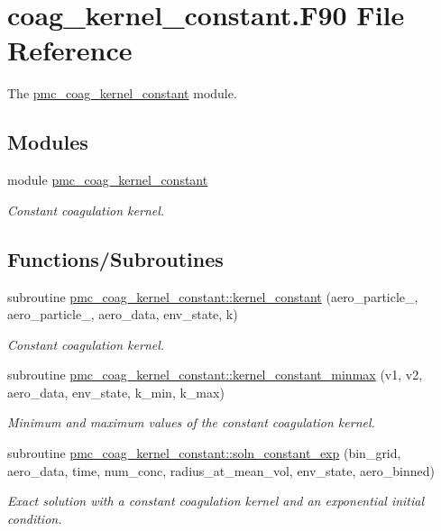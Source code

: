 \hypertarget{coag__kernel__constant_8_f90}{}\section{coag\+\_\+kernel\+\_\+constant.\+F90 File Reference}
\label{coag__kernel__constant_8_f90}


The \mbox{\hyperlink{namespacepmc__coag__kernel__constant}{pmc\+\_\+coag\+\_\+kernel\+\_\+constant}} module.  


\subsection*{Modules}
\begin{DoxyCompactItemize}
\item 
module \mbox{\hyperlink{namespacepmc__coag__kernel__constant}{pmc\+\_\+coag\+\_\+kernel\+\_\+constant}}
\begin{DoxyCompactList}\small\item\em Constant coagulation kernel. \end{DoxyCompactList}\end{DoxyCompactItemize}
\subsection*{Functions/\+Subroutines}
\begin{DoxyCompactItemize}
\item 
subroutine \mbox{\hyperlink{namespacepmc__coag__kernel__constant_ab7d28977bf4b5b1a3a7bdd716c496679}{pmc\+\_\+coag\+\_\+kernel\+\_\+constant\+::kernel\+\_\+constant}} (aero\+\_\+particle\+\_, aero\+\_\+particle\+\_, aero\+\_\+data, env\+\_\+state, k)
\begin{DoxyCompactList}\small\item\em Constant coagulation kernel. \end{DoxyCompactList}\item 
subroutine \mbox{\hyperlink{namespacepmc__coag__kernel__constant_a1ebc8d04a6618fad647e4dcd9c21bb6a}{pmc\+\_\+coag\+\_\+kernel\+\_\+constant\+::kernel\+\_\+constant\+\_\+minmax}} (v1, v2, aero\+\_\+data, env\+\_\+state, k\+\_\+min, k\+\_\+max)
\begin{DoxyCompactList}\small\item\em Minimum and maximum values of the constant coagulation kernel. \end{DoxyCompactList}\item 
subroutine \mbox{\hyperlink{namespacepmc__coag__kernel__constant_a9b2f8e22413812fde935ce8afaca32d9}{pmc\+\_\+coag\+\_\+kernel\+\_\+constant\+::soln\+\_\+constant\+\_\+exp}} (bin\+\_\+grid, aero\+\_\+data, time, num\+\_\+conc, radius\+\_\+at\+\_\+mean\+\_\+vol, env\+\_\+state, aero\+\_\+binned)
\begin{DoxyCompactList}\small\item\em Exact solution with a constant coagulation kernel and an exponential initial condition. \end{DoxyCompactList}\end{DoxyCompactItemize}
